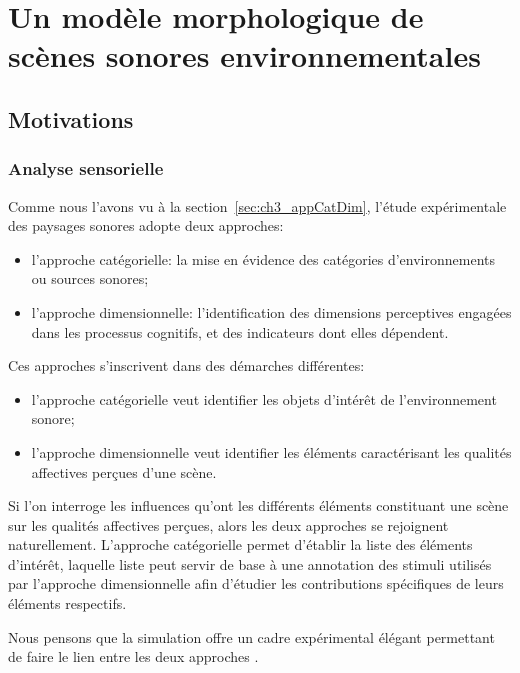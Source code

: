 \chapter[Un modèle morphologique]{Un modèle morphologique de scènes sonores environnementales}\label{ch:psycho_model} %

\section{Motivations}

\subsection{Analyse sensorielle}
\label{sec:ch4_anaSo}

Comme nous l'avons vu à la section~\ref{sec:ch3_appCatDim}, l'étude expérimentale des paysages sonores adopte deux approches:

\begin{itemize}
\item l'approche catégorielle: la mise en évidence des catégories d'environnements ou sources sonores;
\item l'approche dimensionnelle: l'identification des dimensions perceptives engagées dans les processus cognitifs, et des indicateurs dont elles dépendent.
\end{itemize}

Ces approches s'inscrivent dans des démarches différentes:

\begin{itemize}
\item l'approche catégorielle veut identifier les objets d'intérêt  de l'environnement sonore;
\item l'approche dimensionnelle veut identifier les éléments caractérisant les qualités affectives perçues d'une scène.
\end{itemize}

Si l'on interroge les influences qu'ont les différents éléments constituant une scène sur les qualités affectives perçues, alors les deux approches se rejoignent naturellement. L'approche catégorielle permet d'établir la liste des éléments d'intérêt, laquelle liste peut servir de base à une annotation des stimuli utilisés par l'approche dimensionnelle afin d'étudier les contributions spécifiques de leurs éléments respectifs.

Nous pensons que la simulation offre un cadre expérimental élégant permettant de faire le lien entre les deux approches .

